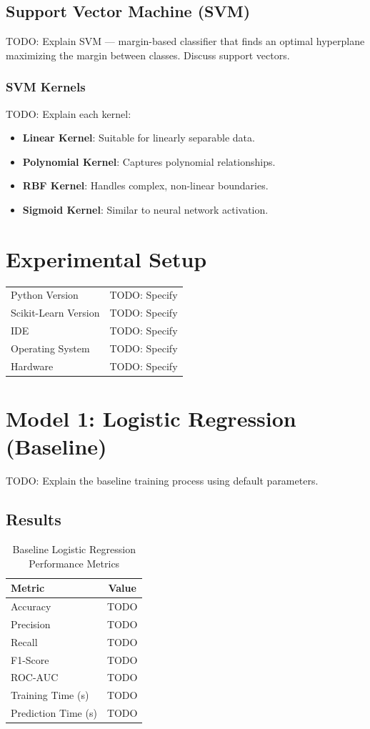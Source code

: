 \documentclass[12pt,a4paper]{article}
\begin{document}
\subsection{Support Vector Machine (SVM)}
TODO: Explain SVM — margin-based classifier that finds an optimal hyperplane maximizing the margin between classes. Discuss support vectors.

\subsubsection{SVM Kernels}
TODO: Explain each kernel:
\begin{itemize}
    \item \textbf{Linear Kernel}: Suitable for linearly separable data.
    \item \textbf{Polynomial Kernel}: Captures polynomial relationships.
    \item \textbf{RBF Kernel}: Handles complex, non-linear boundaries.
    \item \textbf{Sigmoid Kernel}: Similar to neural network activation.
\end{itemize}

\section{Experimental Setup}
\begin{tabular}{ll}
\toprule
Python Version & TODO: Specify \\
Scikit-Learn Version & TODO: Specify \\
IDE & TODO: Specify \\
Operating System & TODO: Specify \\
Hardware & TODO: Specify \\
\bottomrule
\end{tabular}

\section{Model 1: Logistic Regression (Baseline)}
TODO: Explain the baseline training process using default parameters.

\subsection{Results}
\begin{table}[H]
\centering
\begin{tabular}{lc}
\toprule
\textbf{Metric} & \textbf{Value} \\ \midrule
Accuracy & TODO \\
Precision & TODO \\
Recall & TODO \\
F1-Score & TODO \\
ROC-AUC & TODO \\
Training Time (s) & TODO \\
Prediction Time (s) & TODO \\
\bottomrule
\end{tabular}
\caption{Baseline Logistic Regression Performance Metrics}
\end{table}
\end{document}
